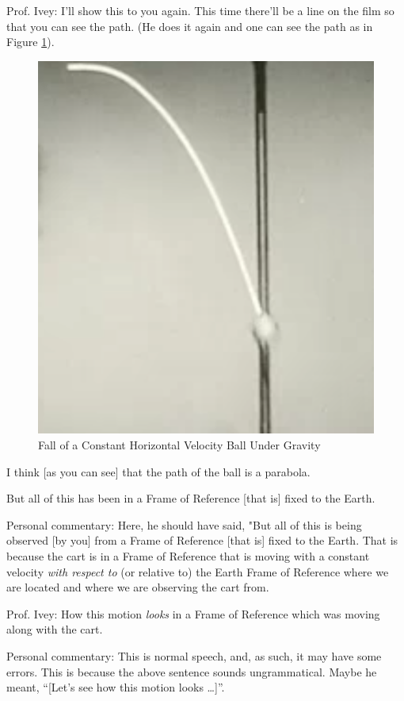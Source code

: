 \documentclass[a6paper]{article}
\newcommand{\perscom}[1]{
    {\footnotesize Personal commentary:  #1}
}
\begin{document}
Prof. Ivey: I'll show this to you again. This time there'll be a line on the film so that you can see the path. (He does it again and one can see the path as in Figure \ref{fig: fall-of-a-constant-horizontal-velocity-ball-under-gravity}).
        \begin{figure}[h!]
            \centering
            \includegraphics[width=0.7\linewidth]{fall-of-a-constant-horizontal-velocity-ball-under-gravity.png}
            \caption{Fall of a Constant Horizontal Velocity Ball Under Gravity}
            \label{fig: fall-of-a-constant-horizontal-velocity-ball-under-gravity}
        \end{figure}

I think [as you can see] that the path of the ball is a parabola. 

But all of this has been in a Frame of Reference [that is] fixed to the Earth. 

\perscom{ Here, he should have said, "But all of this is being observed [by you] from a Frame of Reference [that is] fixed to the Earth. That is because the cart is in a Frame of Reference that is moving with a constant velocity \emph{with respect to} (or relative to) the Earth Frame of Reference where we are located and where we are observing the cart from.}

Prof. Ivey: How this motion \emph{looks} in a Frame of Reference which was moving along with the cart.

\perscom{ This is normal speech, and, as such, it may have some errors. This is because the above sentence sounds ungrammatical. Maybe he meant, ``[Let's see how this motion looks \dots]''.}
\end{document}
